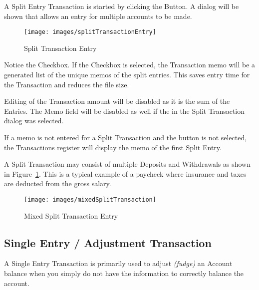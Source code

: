 \documentclass[letterpaper,12pt]{book}
\begin{document}
    A Split Entry Transaction is started by clicking the  Button. A dialog will be shown that allows an entry
    for multiple accounts to be made.

    \begin{figure}[h]
        \caption{Split Transaction Entry}
        \texttt{[image: images/splitTransactionEntry]}
    \end{figure}

    Notice the  Checkbox. If the Checkbox is selected, the Transaction memo will be a generated list
    of the unique memos of the split entries. This saves entry time for the Transaction and reduces the file size.

    Editing of the Transaction amount will be disabled as it is the sum of the Entries. The Memo field will be disabled
    as well if the  in the Split Transaction dialog was selected.

    If a memo is not entered for a Split Transaction and the  button is not selected, the
    Transactions register will display the memo of the first Split Entry.

    A Split Transaction may consist of multiple Deposits and Withdrawals as shown in Figure~\ref{fig:mixed-split-trans}. 
    This is a typical example of a paycheck where insurance and taxes are deducted from the gross salary.


    \begin{figure}[h]        
        \caption{Mixed Split Transaction Entry} \label{fig:mixed-split-trans}
        \texttt{[image: images/mixedSplitTransaction]}               
    \end{figure}

    \subsection{Single Entry / Adjustment Transaction}\label{subsec:single-entry-/-adjustment-transaction}
    A Single Entry Transaction is primarily used to adjust \textit{(fudge)} an Account balance when you simply do not
    have the information to correctly balance the account.
\end{document}
